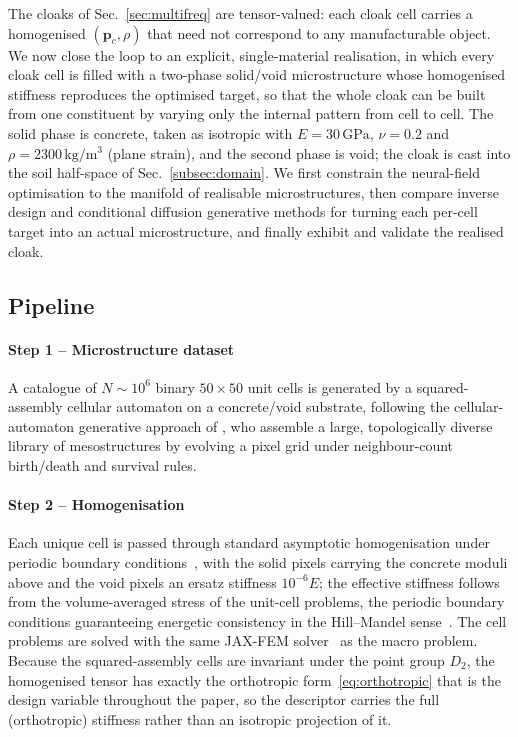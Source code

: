 \documentclass[preprint,12pt]{elsarticle}
\newcommand{\mbf}[1]{\mathbf{#1}}
\begin{document}
The cloaks of Sec.~\ref{sec:multifreq} are tensor-valued: each cloak cell
carries a homogenised $(\mbf{p}_c,\rho)$ that need not correspond to
any manufacturable object. We now close the loop to an explicit, single-material
realisation, in which every cloak cell is filled with a two-phase solid/void
microstructure whose homogenised stiffness reproduces the optimised target, so
that the whole cloak can be built from one constituent by varying only the
internal pattern from cell to cell. The solid phase is concrete, taken as
isotropic with $E=30\,\text{GPa}$, $\nu=0.2$ and
$\rho=2300\,\text{kg}/\text{m}^3$ (plane strain), and the second phase is void;
the cloak is cast into the soil half-space of
Sec.~\ref{subsec:domain}. We first constrain the neural-field
optimisation to the manifold of realisable microstructures, then compare inverse design and conditional diffusion generative methods for turning
each per-cell target into an actual microstructure, and finally exhibit and
validate the realised cloak.

\subsection{Pipeline}\label{subsec:micro_pipeline}

\paragraph{Step 1 -- Microstructure dataset} A catalogue of $N\sim10^{6}$
binary $50\times50$ unit cells is generated by a squared-assembly cellular
automaton on a concrete/void substrate, following the cellular-automaton
generative approach of \citet{nakarmi2024}, who assemble a large,
topologically diverse library of mesostructures by evolving a pixel grid
under neighbour-count birth/death and survival rules.

\paragraph{Step 2 -- Homogenisation} 

Each unique cell is passed through standard
asymptotic homogenisation under periodic boundary
conditions~\citep{bendsoe1988,hassani1998,andreassen2014}, with the solid pixels
carrying the concrete moduli above and the void pixels an ersatz stiffness
$10^{-6}E$; the effective stiffness follows from the volume-averaged stress of
the unit-cell problems, the periodic boundary conditions guaranteeing
energetic consistency in the Hill--Mandel sense~\citep{hill1963}. The cell
problems are solved with the same JAX-FEM solver~\citep{xu2020jaxfem} as the
macro problem. Because the squared-assembly cells are
invariant under the point group $D_2$, the homogenised tensor has exactly the orthotropic
form~\eqref{eq:orthotropic} that is the design variable throughout the paper, so the descriptor carries the full (orthotropic) stiffness rather than an isotropic projection of it.
\end{document}
